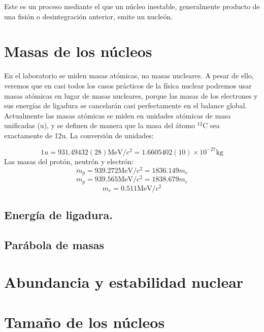 Este es un proceso mediante el que un núcleo inestable, generalmente producto de una fisión o desintegración anterior, emite un nucleón. 

\section{Masas de los núcleos}

En el laboratorio se miden masas atómicas, no masas nucleares. A pesar de ello, veremos que en casi todos los casos prácticos de la física nuclear podremos usar masas atómicas en lugar de masas nucleares, porque las masas de los electrones y sus energías de ligadura se cancelarán casi perfectamente en el balance global. Actualmente las masas atómicas se miden en unidades atómicas de masa unificadas (u), y se definen de manera que la masa del átomo $^{12}$C sea exactamente de 12u. La conversión de unidades:

\begin{equation}
    1u = 931.49432(28) \unit{\MeV/c^2} = 1.6605402(10) \times 10^{-27} \unit{\kg}
\end{equation}
Las masas del protón, neutrón y electrón:
\begin{equation}
    m_p = 939.272 \unit{\MeV/c^2} = 1836.149 m_e
\end{equation}
\begin{equation}
    m_p = 939.565 \unit{\MeV/c^2} = 1838.679 m_e
\end{equation}
\begin{equation}
    m_e = 0.511 \unit{\MeV/c^2} 
\end{equation}

\subsection{Energía de ligadura.}

\subsection{Parábola de masas}

\section{Abundancia y estabilidad nuclear}

\section{Tamaño de los núcleos}


